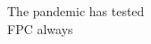 \documentclass[../../../main.tex]{subfiles}
\begin{document}
The pandemic has tested 
\\
\vspace{0.15cm}
FPC always  
\end{document}
